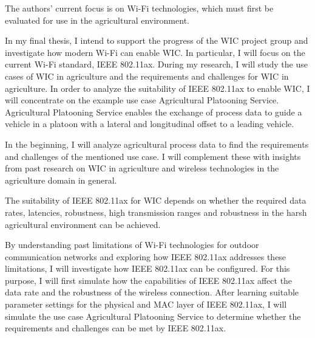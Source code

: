 The authors' current focus is on Wi-Fi technologies, which must first be evaluated
for use in the agricultural environment.

In my final thesis, I intend to support the progress of the \ac{WIC} project group and investigate how modern Wi-Fi can enable \ac{WIC}.
 In particular, I will focus on the current Wi-Fi standard, IEEE 802.11ax.
During my research, I will study the use cases of \ac{WIC} in agriculture and the requirements and challenges for \ac{WIC} in agriculture.
In order to analyze the suitability of IEEE 802.11ax to enable \ac{WIC}, I will concentrate on the example use case Agricultural Platooning Service.
Agricultural Platooning Service enables the exchange of process data
to guide a vehicle in a platoon with a lateral and longitudinal offset to a leading vehicle.

In the beginning, I will analyze agricultural process data to find the requirements and challenges of the mentioned use case.
I will complement these with insights from past research on \ac{WIC} in agriculture and wireless technologies
in the agriculture domain in general.

The suitability of IEEE 802.11ax for \ac{WIC} depends on whether the required data rates, latencies, robustness, high
transmission ranges and robustness in the harsh agricultural environment can be achieved.

By understanding past limitations of Wi-Fi technologies for outdoor communication networks
and exploring how IEEE 802.11ax addresses these limitations, I will investigate how IEEE 802.11ax can be configured.
For this purpose, I will first simulate how the capabilities of IEEE 802.11ax affect the data rate and the robustness of the wireless connection.
After learning suitable parameter settings for the physical and MAC layer of IEEE 802.11ax, I will simulate the use case
Agricultural Platooning Service to determine whether the requirements and challenges
can be met by IEEE 802.11ax.


